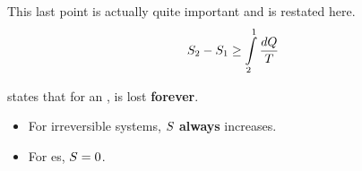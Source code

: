 This last point is actually quite important and is restated here.
\begin{equation}\label{eq:Reversible_Process_Entropy_Lost}
  S_{2} - S_{1} \geq \int\limits_{2}^{1} \frac{d Q}{T}
\end{equation}

 states that for an ,  is lost \textbf{forever}.
\begin{itemize}[noitemsep]
\item For irreversible systems, $S$ \textbf{always} increases.
\item For es, $S = 0$.
\end{itemize}

